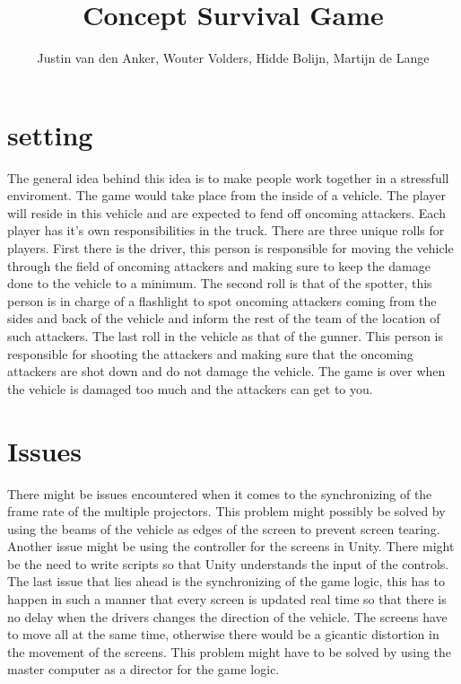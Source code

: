 \documentclass[10pt,a4paper]{article}
\author{Justin van den Anker, Wouter Volders, Hidde Bolijn, Martijn de Lange}
\title{Concept Survival Game}
\begin{document}
\maketitle
\newpage
\section{setting}
The general idea behind this idea is to make people work together in a stressfull enviroment. The game would take place from the inside of a vehicle. The player will reside in this vehicle and are expected to fend off oncoming attackers. Each player has it's own responsibilities in the truck. There are three unique rolls for players. First there is the driver, this person is responsible for moving the vehicle through the field of oncoming attackers and making sure to keep the damage done to the vehicle to a minimum. The second roll is that of the spotter, this person is in charge of a flashlight to spot oncoming attackers coming from the sides and back of the vehicle and inform the rest of the team of the location of such attackers. The last roll in the vehicle as that of the gunner. This person is responsible for shooting the attackers and making sure that the oncoming attackers are shot down and do not damage the vehicle. The game is over when the vehicle is damaged too much and the attackers can get to you. 

\section{Issues}

There might be issues encountered when it comes to the synchronizing of the frame rate of the multiple projectors. This problem might possibly be solved by using the beams of the vehicle as edges of the screen to prevent screen tearing. Another issue might be using the controller for the screens in Unity. There might be the need to write scripts so that Unity understands the input of the controls. The last issue that lies ahead is the synchronizing of the game logic, this has to happen in such a manner that every screen is updated real time so that there is no delay when the drivers changes the direction of the vehicle. The screens have to move all at the same time, otherwise there would be a gicantic distortion in the movement of the screens. This problem might have to be solved by using the master computer as a director for the game logic.
\end{document}
